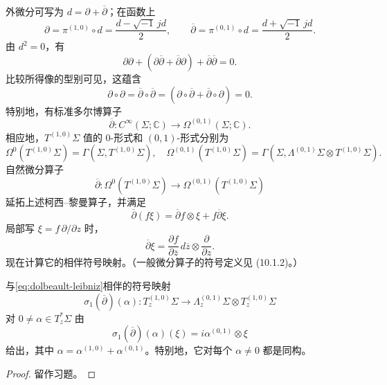 外微分可写为 $d=\partial+\overline\partial$；在函数上
\[
 \partial=\pi^{(1,0)}\circ d=\frac{d-\sqrt{-1}\,jd}{2},
 \qquad
 \overline\partial=\pi^{(0,1)}\circ d=\frac{d+\sqrt{-1}\,jd}{2}.
\]
由 $d^2=0$，有
\[
 \partial\partial
 +(\partial\overline\partial+\overline\partial\partial)
 +\overline\partial\overline\partial=0.
\]
比较所得像的型别可见，这蕴含
\[
 \partial\circ\partial
 =\overline\partial\circ\overline\partial
 =(\partial\circ\overline\partial
 +\overline\partial\circ\partial)=0.
\]
特别地，有标准多尔博算子
\begin{equation}
 \overline\partial:C^\infty(\Sigma;\mathbb C)
 \longrightarrow\Omega^{(0,1)}(\Sigma;\mathbb C).
 \label{eq:standard-dolbeault-operator}
\end{equation}
相应地，$T^{(1,0)}\Sigma$ 值的 $0$-形式和 $(0,1)$-形式分别为
\[
 \Omega^0(T^{(1,0)}\Sigma)=\Gamma(\Sigma,T^{(1,0)}\Sigma),
 \quad
 \Omega^{(0,1)}(T^{(1,0)}\Sigma)
 =\Gamma(\Sigma,\Lambda^{(0,1)}\Sigma\otimes T^{(1,0)}\Sigma).
\]
自然微分算子
\begin{equation}
 \overline\partial:\Omega^0(T^{(1,0)}\Sigma)
 \longrightarrow\Omega^{(0,1)}(T^{(1,0)}\Sigma)
 \label{eq:dolbeault-tangent-bundle}
\end{equation}
延拓上述柯西--黎曼算子，并满足
\begin{equation}
 \overline\partial(f\xi)=\overline\partial f\otimes\xi+f\overline\partial\xi.
 \label{eq:dolbeault-leibniz}
\end{equation}
局部写 $\xi=f\,\partial/\partial z$ 时，
\[
 \overline\partial\xi=\frac{\partial f}{\partial\overline z}
 \,d\overline z\otimes\frac\partial{\partial z}.
\]
现在计算它的相伴符号映射。（一般微分算子的符号定义见 (10.1.2)。）

\begin{proposition}\label{prop:symbol-dolbeault-tangent}
与\eqref{eq:dolbeault-leibniz}相伴的符号映射
\begin{equation}
 \sigma_1(\overline\partial)(\alpha):T_z^{(1,0)}\Sigma
 \longrightarrow\Lambda_z^{(0,1)}\Sigma\otimes T_z^{(1,0)}\Sigma
 \label{eq:symbol-dolbeault-tangent}
\end{equation}
对 $0\ne\alpha\in T_z^*\Sigma$ 由
\[
 \sigma_1(\overline\partial)(\alpha)(\xi)
 =i\alpha^{(0,1)}\otimes\xi
\]
给出，其中 $\alpha=\alpha^{(1,0)}+\alpha^{(0,1)}$。特别地，它对每个 $\alpha\ne0$ 都是同构。
\end{proposition}
\begin{proof}
留作习题。
\end{proof}

